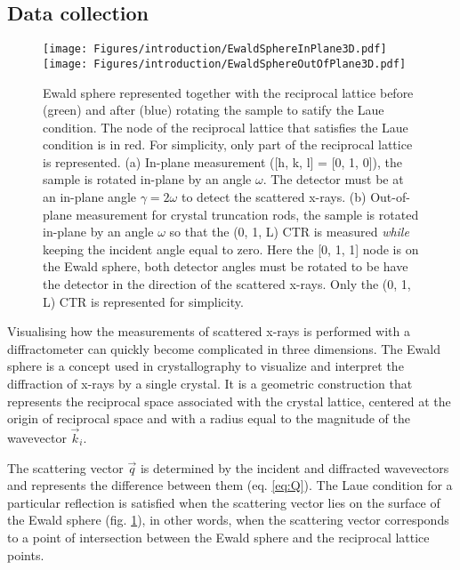 \subsection{Data collection} \label{sec:DataCollectionSXRD}

\begin{figure}[!htb]
    \centering
    \texttt{[image: Figures/introduction/EwaldSphereInPlane3D.pdf]}
    \texttt{[image: Figures/introduction/EwaldSphereOutOfPlane3D.pdf]}
    \caption{
    Ewald sphere represented together with the reciprocal lattice before (green) and after (blue) rotating the sample to satify the Laue condition.
    The node of the reciprocal lattice that satisfies the Laue condition is in red.
    For simplicity, only part of the reciprocal lattice is represented.
    (a) In-plane measurement ([h, k, l] = [0, 1, 0]), the sample is rotated in-plane by an angle $\omega$.
    The detector must be at an in-plane angle $\gamma=2\omega$ to detect the scattered x-rays.
    (b) Out-of-plane measurement for crystal truncation rods, the sample is rotated in-plane by an angle $\omega$ so that the (0, 1, L) CTR is measured \textit{while} keeping the incident angle equal to zero.
    Here the [0, 1, 1] node is on the Ewald sphere, both detector angles must be rotated to be have the detector in the direction of the scattered x-rays.
    Only the (0, 1, L) CTR is represented for simplicity.
    }
    \label{fig:EwaldSphere}
\end{figure}

Visualising how the measurements of scattered x-rays is performed with a diffractometer can quickly become complicated in three dimensions.
The Ewald sphere is a concept used in crystallography to visualize and interpret the diffraction of x-rays by a single crystal.
It is a geometric construction that represents the reciprocal space associated with the crystal lattice, centered at the origin of reciprocal space and with a radius equal to the magnitude of the wavevector $\vec{k}_i$.

The scattering vector $\vec{q}$ is determined by the incident and diffracted wavevectors and represents the difference between them (eq. \ref{eq:Q}).
The Laue condition for a particular reflection is satisfied when the scattering vector lies on the surface of the Ewald sphere (fig. \ref{fig:EwaldSphere}), in other words, when the scattering vector corresponds to a point of intersection between the Ewald sphere and the reciprocal lattice points.

